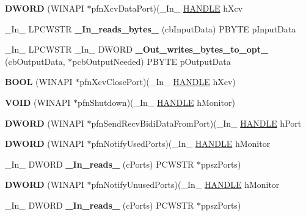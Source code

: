\begin{DoxyCompactItemize}
\mbox{\label{struct___m_o_n_i_t_o_r2_aaa07ac590babb2b7723c0ea009971c72}} 
{\bfseries D\+W\+O\+RD} (W\+I\+N\+A\+PI $\ast$pfn\+Xcv\+Data\+Port)(\+\_\+\+In\+\_\+ \hyperlink{interfacevoid}{H\+A\+N\+D\+LE} h\+Xcv
\item 
\mbox{\label{struct___m_o_n_i_t_o_r2_a42dd50235e58dda86f2ab8352a4fcf6f}} 
\+\_\+\+In\+\_\+ L\+P\+C\+W\+S\+TR {\bfseries \+\_\+\+In\+\_\+reads\+\_\+bytes\+\_\+} (cb\+Input\+Data) P\+B\+Y\+TE p\+Input\+Data
\item 
\mbox{\label{struct___m_o_n_i_t_o_r2_af3485ac5fd601273b0c057027ec60cdf}} 
\+\_\+\+In\+\_\+ L\+P\+C\+W\+S\+TR \+\_\+\+In\+\_\+ D\+W\+O\+RD {\bfseries \+\_\+\+Out\+\_\+writes\+\_\+bytes\+\_\+to\+\_\+opt\+\_\+} (cb\+Output\+Data, $\ast$pcb\+Output\+Needed) P\+B\+Y\+TE p\+Output\+Data
\item 
\mbox{\label{struct___m_o_n_i_t_o_r2_a73337a0bda7bab5e7a66d23bd1467701}} 
{\bfseries B\+O\+OL} (W\+I\+N\+A\+PI $\ast$pfn\+Xcv\+Close\+Port)(\+\_\+\+In\+\_\+ \hyperlink{interfacevoid}{H\+A\+N\+D\+LE} h\+Xcv)
\item 
\mbox{\label{struct___m_o_n_i_t_o_r2_a8167af799ecd18b63646ebfb3612d973}} 
{\bfseries V\+O\+ID} (W\+I\+N\+A\+PI $\ast$pfn\+Shutdown)(\+\_\+\+In\+\_\+ \hyperlink{interfacevoid}{H\+A\+N\+D\+LE} h\+Monitor)
\item 
\mbox{\label{struct___m_o_n_i_t_o_r2_a5bc10fedd0233c6a855a90049c7925d1}} 
{\bfseries D\+W\+O\+RD} (W\+I\+N\+A\+PI $\ast$pfn\+Send\+Recv\+Bidi\+Data\+From\+Port)(\+\_\+\+In\+\_\+ \hyperlink{interfacevoid}{H\+A\+N\+D\+LE} h\+Port
\item 
\mbox{\label{struct___m_o_n_i_t_o_r2_a3f48099bbc5db5730e58a6fa3d055f41}} 
{\bfseries D\+W\+O\+RD} (W\+I\+N\+A\+PI $\ast$pfn\+Notify\+Used\+Ports)(\+\_\+\+In\+\_\+ \hyperlink{interfacevoid}{H\+A\+N\+D\+LE} h\+Monitor
\item 
\mbox{\label{struct___m_o_n_i_t_o_r2_abf6ad51469852ff0b4cf5363eda55611}} 
\+\_\+\+In\+\_\+ D\+W\+O\+RD {\bfseries \+\_\+\+In\+\_\+reads\+\_\+} (c\+Ports) P\+C\+W\+S\+TR $\ast$ppsz\+Ports)
\item 
\mbox{\label{struct___m_o_n_i_t_o_r2_ae12c351788c1562be7b4e76f677137ba}} 
{\bfseries D\+W\+O\+RD} (W\+I\+N\+A\+PI $\ast$pfn\+Notify\+Unused\+Ports)(\+\_\+\+In\+\_\+ \hyperlink{interfacevoid}{H\+A\+N\+D\+LE} h\+Monitor
\item 
\mbox{\label{struct___m_o_n_i_t_o_r2_abf6ad51469852ff0b4cf5363eda55611}} 
\+\_\+\+In\+\_\+ D\+W\+O\+RD {\bfseries \+\_\+\+In\+\_\+reads\+\_\+} (c\+Ports) P\+C\+W\+S\+TR $\ast$ppsz\+Ports)
\end{DoxyCompactItemize}
